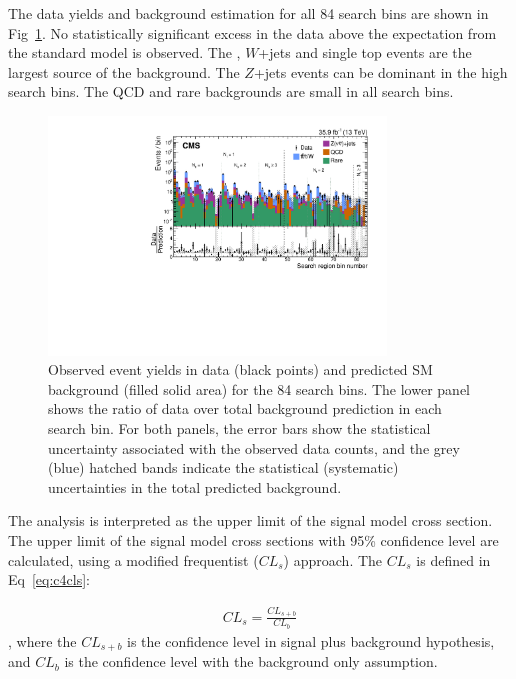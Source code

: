 The data yields and background estimation for all 84 search bins are shown in Fig~\ref{fig:84sbunblind}. No statistically significant excess in the data above the expectation from the standard model is observed. The \ttbar, $W$+jets and single top events are the largest source of the background. The $Z$+jets events can be dominant in the high \MET search bins. The QCD and rare backgrounds are small in all search bins. 

\begin{figure}[htbp]
 \begin{center}
  \includegraphics[width=0.8\textwidth]{sections/mc4/Results/figures/UnblindPlots.pdf}
 \end{center}
 \caption{Observed event yields in data (black points) and predicted SM background (filled solid area) for the 84 search bins. The lower panel shows the ratio of data over total background prediction in each search bin. For both panels, the error bars show the statistical uncertainty associated with the observed data counts, and the grey (blue) hatched bands indicate the statistical (systematic) uncertainties in the total predicted background.}
 \label{fig:84sbunblind}
\end{figure}

The analysis is interpreted as the upper limit of the signal model cross section. The upper limit of the signal model cross sections with 95\% confidence level are calculated, using a modified frequentist ($CL_{s}$) approach\cite{Cowan:2010js}. The $CL_{s}$ is defined in Eq~\ref{eq:c4cls}:

\begin{equation}
 \begin{aligned}
  CL_{s}=\frac{CL_{s+b}}{CL_{b}}
 \end{aligned}
 \label{eq:c4cls}
\end{equation}
, where the $CL_{s+b}$ is the confidence level in signal plus background hypothesis, and $CL_{b}$ is the confidence level with the background only assumption. 


